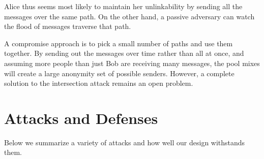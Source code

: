 \documentclass[final]{ieee}
\begin{document}

Alice thus seems most likely to maintain her unlinkability by sending all
the messages over the same path. On the other hand, a passive adversary
can watch the flood of messages traverse that path.

A compromise approach is to pick a small number of paths and use them
together. By sending out the messages over time rather than all at once,
and assuming more people than just Bob are receiving many messages,
the pool mixes will create a large anonymity set of possible senders.
However, a complete solution to the intersection attack remains an
open problem.





\section{Attacks and Defenses}
\label{sec:attacks}

Below we summarize a variety of attacks and how well our design withstands
them.
\end{document}

